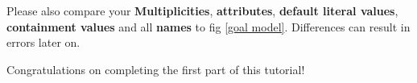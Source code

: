 Please also compare your \textbf{Multiplicities}, \textbf{attributes}, \textbf{default literal values}, \textbf{containment values} and all \textbf{names} to fig \ref{goal model}. Differences can result in errors later on.\newline

Congratulations on completing the first part of this tutorial!

\clearpage
